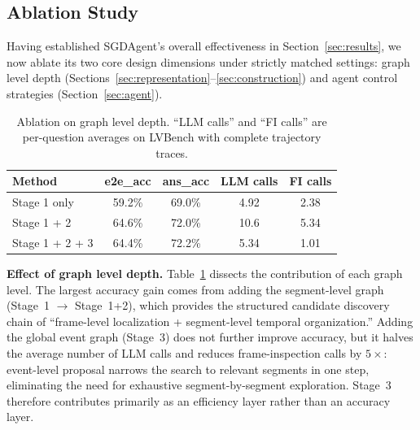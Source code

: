 \documentclass[sigconf, screen, review, anonymous]{acmart}
\begin{document}

\subsection{Ablation Study}
\label{sec:ablation}

Having established SGDAgent's overall effectiveness in
Section~\ref{sec:results}, we now ablate its two core design dimensions
under strictly matched settings: graph level depth
(Sections~\ref{sec:representation}--\ref{sec:construction}) and agent
control strategies (Section~\ref{sec:agent}).




\begin{table}[t]
  \centering
  \caption{Ablation on graph level depth.  ``LLM calls'' and ``FI calls''
           are per-question averages on LVBench with complete
           trajectory traces.}
  \label{tab:tiers}
  \begin{tabular}{lcccc}
    \toprule
    Method & e2e\_acc & ans\_acc & LLM calls & FI calls \\
    \midrule
    Stage 1 only          & 59.2\% & 69.0\% & 4.92 & 2.38 \\
    Stage 1 + 2           & 64.6\% & 72.0\% & 10.6 & 5.34  \\
    Stage 1 + 2 + 3       & 64.4\% & 72.2\% & 5.34  & 1.01  \\
    \bottomrule
  \end{tabular}
\end{table}

\textbf{Effect of graph level depth.}\quad
Table~\ref{tab:tiers} dissects the contribution of each graph level.  The
largest accuracy gain comes from adding the segment-level graph (Stage~1
$\to$ Stage~1+2), which provides the structured candidate discovery
chain of ``frame-level localization + segment-level temporal
organization.''  Adding the global event graph (Stage~3) does not further
improve accuracy, but it halves the average number of LLM calls and
reduces frame-inspection calls by $5\times$: event-level proposal
narrows the search to relevant segments in one step, eliminating the
need for exhaustive segment-by-segment exploration.  Stage~3 therefore
contributes primarily as an efficiency layer rather than an accuracy
layer.
\end{document}
